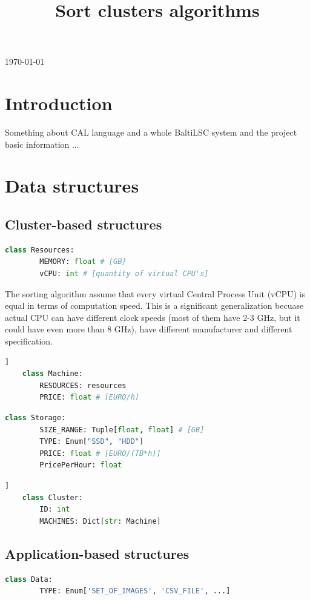 \documentclass{article}
\title{Sort clusters algorithms}
\begin{document}
	\maketitle
	\today
	\section{Introduction}
	
	Something about CAL language and a whole BaltiLSC system and the project basic information ...
	
	\section{Data structures}
	\subsection{Cluster-based structures}
	\begin{lstlisting}[language=Python]
	class Resources:
		MEMORY: float # [GB]
		vCPU: int # [quantity of virtual CPU's]
	\end{lstlisting}
	
	The sorting algorithm assume that every virtual Central Process Unit (vCPU) is equal in terms of computation speed. This is a significant generalization becuase actual CPU can have different clock speeds (most of them have 2-3 GHz, but it could have even more than 8 GHz\cite{max_clock_speed}), have different manufacturer and different specification.
	
	\begin{lstlisting}[language=Python,label={lst:Machine}, caption=Machine data structure]]
	class Machine:
		RESOURCES: resources
		PRICE: float # [EURO/h]
	\end{lstlisting}
	
	\begin{lstlisting}[language=Python]
	class Storage:
		SIZE_RANGE: Tuple[float, float] # [GB]
		TYPE: Enum["SSD", "HDD"]
		PRICE: float # [EURO/(TB*h)]
		PricePerHour: float
	\end{lstlisting}
	
	\begin{lstlisting}[language=Python,label={lst:Cluster}, caption=Cluster data structure]]
	class Cluster:
		ID: int
		MACHINES: Dict[str: Machine]
	\end{lstlisting}
	
	\subsection{Application-based structures}
	\begin{lstlisting}[language=Python]
	class Data:
		TYPE: Enum['SET_OF_IMAGES', 'CSV_FILE', ...]
	\end{lstlisting}
	
\end{document}
